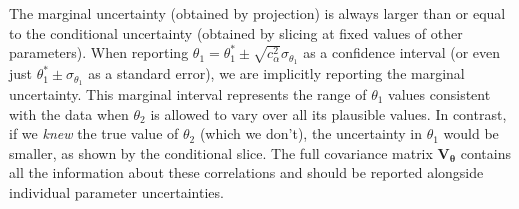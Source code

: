 \begin{warningBox}
    \vspace{0.3cm}

    The marginal uncertainty (obtained by projection) is always larger than or equal to the conditional uncertainty (obtained by slicing at fixed values of other parameters). When reporting $\theta_1 = \theta_1^* \pm \sqrt{c_\alpha^2}\sigma_{\theta_1}$ as a confidence interval (or even just $\theta_1^* \pm \sigma_{\theta_1}$ as a standard error), we are implicitly reporting the marginal uncertainty. This marginal interval represents the range of $\theta_1$ values consistent with the data when $\theta_2$ is allowed to vary over all its plausible values. In contrast, if we \textit{knew} the true value of $\theta_2$ (which we don't), the uncertainty in $\theta_1$ would be smaller, as shown by the conditional slice. The full covariance matrix $\mathbf{V}_{\boldsymbol{\theta}}$ contains all the information about these correlations and should be reported alongside individual parameter uncertainties.
\end{warningBox}


